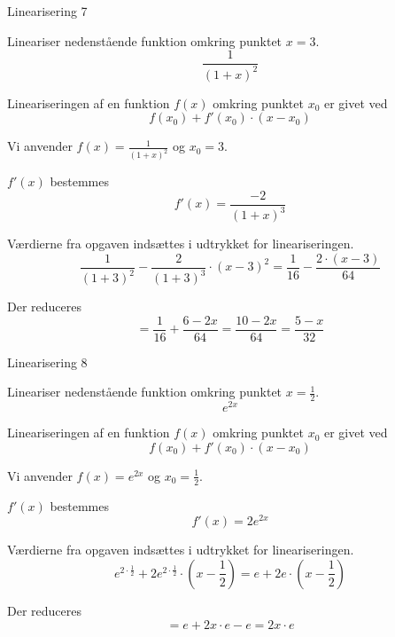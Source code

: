 \documentclass{article}
\begin{document}
\begin{exercise}{Linearisering 7}
	
	Lineariser nedenstående funktion omkring punktet $x = 3$.
	\[
	\frac{1}{(1+x)^2}
	\]
	
	
	\hint
	Lineariseringen af en funktion $f(x)$
	omkring punktet $x_0$ er givet ved
	\[
	f(x_0) + f'(x_0) \cdot (x - x_0)
	\]
	
	\hint
	Vi anvender $f(x) = \frac{1}{(1+x)^2}$ og $x_0 = 3$.
	
	\hint
	$f'(x)$ bestemmes
	\[
	f'(x) = \frac{-2}{(1+x)^3}
	\]
	
	\hint
	Værdierne fra opgaven indsættes i udtrykket for lineariseringen.
	\[
	\frac{1}{(1+3)^2} - \frac{2}{(1+3)^3} \cdot (x-3)^2 = \frac{1}{16} - \frac{2 \cdot (x - 3)}{64}
	\]
	
	\hint
	Der reduceres
	\[
	= \frac{1}{16} + \frac{6 - 2x}{64} = \frac{10 - 2x}{64} = \frac{5-x}{32}
	\]
	
\end{exercise}

\begin{exercise}{Linearisering 8}
	
	Lineariser nedenstående funktion omkring punktet $x = \frac{1}{2}$.
	\[
	e^{2x}
	\]
	
	
	\hint
	Lineariseringen af en funktion $f(x)$
	omkring punktet $x_0$ er givet ved
	\[
	f(x_0) + f'(x_0) \cdot (x - x_0)
	\]
	
	\hint
	Vi anvender $f(x) = e^{2x}$ og $x_0 = \frac{1}{2}$.
	
	\hint
	$f'(x)$ bestemmes
	\[
	f'(x) = 2 e^{2x}
	\]
	
	\hint
	Værdierne fra opgaven indsættes i udtrykket for lineariseringen.
	\[
	e^{2 \cdot \frac{1}{2}} + 2 e^{2 \cdot \frac{1}{2}} \cdot (x - \frac{1}{2}) = e + 2 e \cdot (x - \frac{1}{2})
	\]
	
	\hint
	Der reduceres
	\[
	= e + 2x \cdot e - e = 2x \cdot e
	\]
	
\end{exercise}
\end{document}
